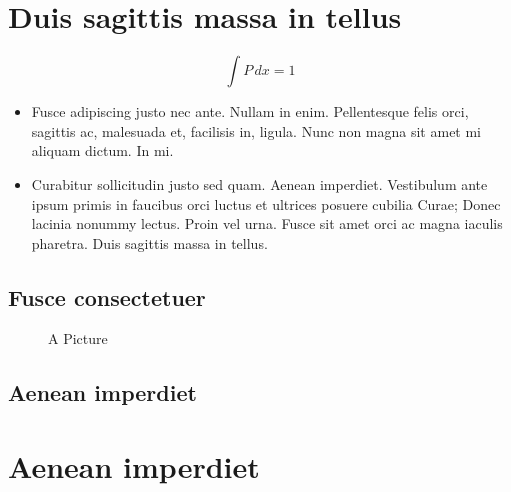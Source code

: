 \documentclass{template/openetcs_report}
\begin{document}
\lipsum[9]

\chapter{Duis sagittis massa in tellus}

\lipsum[11]

\begin{equation}
  \label{eq:B}
  \int P\,dx =1
\end{equation}

\begin{itemize}
\item Fusce adipiscing justo nec ante. Nullam in enim.
  Pellentesque felis orci, sagittis ac, malesuada et, facilisis in,
  ligula. Nunc non magna sit amet mi aliquam dictum. In mi.
\item Curabitur
  sollicitudin justo sed quam. Aenean imperdiet. Vestibulum ante ipsum
  primis in faucibus orci luctus et ultrices posuere cubilia Curae;
  Donec lacinia nonummy lectus. Proin vel urna. Fusce sit amet orci ac
  magna iaculis pharetra. Duis sagittis massa in tellus.
\end{itemize}

\section{Fusce consectetuer}

\lipsum[10]

\begin{figure}
  \centering
  \caption{A Picture}
  \label{fig:nola}
\end{figure}

\section{Aenean imperdiet}

\lipsum[11]

\nocite{*}




\appendix

\chapter{Aenean imperdiet}
\end{document}
